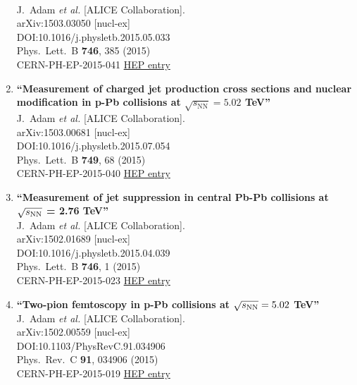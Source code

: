 \begin{enumerate}
  \\{}J.~Adam {\it et al.} [ALICE Collaboration].
  \\{}arXiv:1503.03050 [nucl-ex]
  \\{}DOI:10.1016/j.physletb.2015.05.033
  \\{}Phys.\ Lett.\ B {\bf 746}, 385 (2015)
  \\{}CERN-PH-EP-2015-041
\href{http://inspirehep.net/record/1351451}{HEP entry}
\item%
{\bf ``Measurement of charged jet production cross sections and nuclear modification in p-Pb collisions at $\sqrt{s_\mathrm{NN}} = 5.02$ TeV''}
  \\{}J.~Adam {\it et al.} [ALICE Collaboration].
  \\{}arXiv:1503.00681 [nucl-ex]
  \\{}DOI:10.1016/j.physletb.2015.07.054
  \\{}Phys.\ Lett.\ B {\bf 749}, 68 (2015)
  \\{}CERN-PH-EP-2015-040
\href{http://inspirehep.net/record/1346963}{HEP entry}
\item%
{\bf ``Measurement of jet suppression in central Pb-Pb collisions at $\sqrt{s_{\rm NN}}$ = 2.76 TeV''}
  \\{}J.~Adam {\it et al.} [ALICE Collaboration].
  \\{}arXiv:1502.01689 [nucl-ex]
  \\{}DOI:10.1016/j.physletb.2015.04.039
  \\{}Phys.\ Lett.\ B {\bf 746}, 1 (2015)
  \\{}CERN-PH-EP-2015-023
\href{http://inspirehep.net/record/1343112}{HEP entry}
\item%
{\bf ``Two-pion femtoscopy in p-Pb collisions at $\sqrt{s_{\rm NN}}=5.02$ TeV''}
  \\{}J.~Adam {\it et al.} [ALICE Collaboration].
  \\{}arXiv:1502.00559 [nucl-ex]
  \\{}DOI:10.1103/PhysRevC.91.034906
  \\{}Phys.\ Rev.\ C {\bf 91}, 034906 (2015)
  \\{}CERN-PH-EP-2015-019
\href{http://inspirehep.net/record/1342499}{HEP entry}

\end{enumerate}
